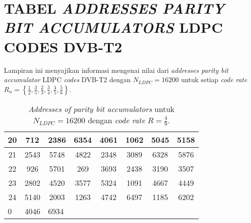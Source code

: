 \chapter{TABEL \textit{ADDRESSES PARITY BIT ACCUMULATORS} LDPC CODES DVB-T2}

\setcounter{table}{0}
\renewcommand{\thetable}{A.\arabic{table}}

Lampiran ini menyajikan informasi mengenai nilai dari \textit{addresses parity bit accumulator} LDPC \textit{codes} DVB-T2 dengan $N_{LDPC}=16200$ untuk setiap \textit{code rate} $R_n=\left \{\frac{1}{2}, \frac{3}{5}, \frac{2}{3}, \frac{3}{4}, \frac{4}{5}, \frac{5}{6} \right \}$.
\clearpage
\begin{table}[tb]
	\centering
	\caption{\textit{Addresses of parity bit accumulators} untuk $N_{LDPC}=16200$ dengan \textit{code rate} $R=\frac{4}{9}$.}
	\label{table:rate1}
	\begin{tabular}{|l|l|l|lllll}
		\hline
		\multicolumn{1}{|c|}{20} & \multicolumn{1}{c|}{712}  & \multicolumn{1}{c|}{2386} & \multicolumn{1}{c|}{6354} & \multicolumn{1}{c|}{4061} & \multicolumn{1}{c|}{1062} & \multicolumn{1}{c|}{5045} & \multicolumn{1}{c|}{5158} \\ \hline
		\multicolumn{1}{|c|}{21} & \multicolumn{1}{c|}{2543} & \multicolumn{1}{c|}{5748} & \multicolumn{1}{c|}{4822} & \multicolumn{1}{c|}{2348} & \multicolumn{1}{c|}{3089} & \multicolumn{1}{c|}{6328} & \multicolumn{1}{c|}{5876} \\ \hline
		\multicolumn{1}{|c|}{22} & \multicolumn{1}{c|}{926}  & \multicolumn{1}{c|}{5701} & \multicolumn{1}{c|}{269}  & \multicolumn{1}{c|}{3693} & \multicolumn{1}{c|}{2438} & \multicolumn{1}{c|}{3190} & \multicolumn{1}{c|}{3507} \\ \hline
		\multicolumn{1}{|c|}{23} & \multicolumn{1}{c|}{2802} & \multicolumn{1}{c|}{4520} & \multicolumn{1}{c|}{3577} & \multicolumn{1}{c|}{5324} & \multicolumn{1}{c|}{1091} & \multicolumn{1}{c|}{4667} & \multicolumn{1}{c|}{4449} \\ \hline
		\multicolumn{1}{|c|}{24} & \multicolumn{1}{c|}{5140} & \multicolumn{1}{c|}{2003} & \multicolumn{1}{c|}{1263} & \multicolumn{1}{c|}{4742} & \multicolumn{1}{c|}{6497} & \multicolumn{1}{c|}{1185} & \multicolumn{1}{c|}{6202} \\ \hline
		0                        & 4046                      & 6934                      &                           &                           &                           &                           &                           \\ \cline{1-3}

\end{tabular}
\end{table}
